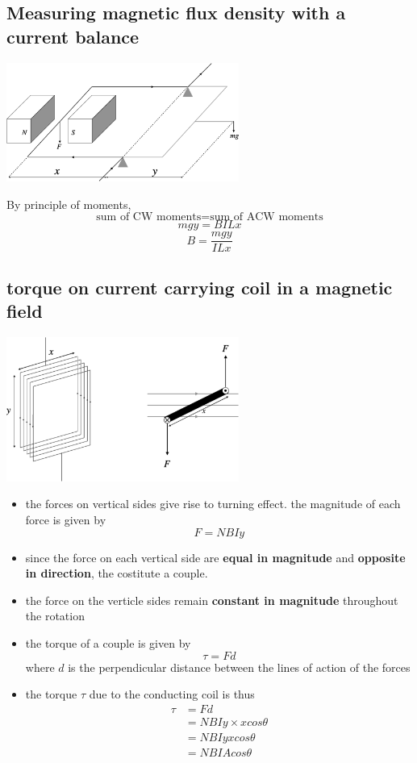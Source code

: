 \documentclass[a4paper, 10pt]{article}
\begin{document}
\subsection{Measuring magnetic flux density with a current balance}
\begin{center}
   \includegraphics[width=3in]{figures/5.pdf} 
\end{center}	

By principle of moments, 
\[
   \text{sum of CW moments} =  \text{sum of ACW moments}
\]
\[
mgy = BILx
\]
\[
B = \frac{mgy}{ILx}
\]

\subsection{torque on current carrying coil in a magnetic field}
\begin{center}
   \includegraphics[width=3in]{figures/6.pdf} 
\end{center}	
\begin{itemize}
   \item the forces on vertical sides give rise to turning effect. the magnitude of each force is given by
      \[
      F = NBIy
      \]
   \item since the force on each vertical side are \textbf{equal in magnitude} and \textbf{opposite in direction}, the costitute a couple.
   \item the force on the verticle sides remain \textbf{constant in magnitude} throughout the rotation
   \item the torque of a couple is given by
      \[
      \tau = Fd
      \]
     where $d$ is the perpendicular distance between the lines of action of the forces
   \item the torque $\tau$ due to the conducting coil is thus
     \begin{align*}
        \tau &= Fd \\
             &= NBIy \times x cos \theta \\
             &= NBIyxcos \theta \\
             &= NBIA cos \theta
     \end{align*}	 
\end{itemize}	
\end{document}
